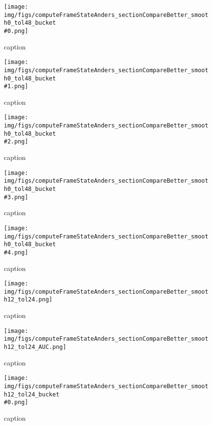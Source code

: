 %
\begin{figure}[!ht]
	\centering
	\texttt{[image: img/figs/computeFrameStateAnders\_sectionCompareBetter\_smooth0\_tol48\_bucket\\\#0.png]}
	\caption{caption}
	\label{fig:computeFrameStateAnders_sectionCompareBetter_smooth0_tol48_bucket\#0.png}
\end{figure}
%
\begin{figure}[!ht]
	\centering
	\texttt{[image: img/figs/computeFrameStateAnders\_sectionCompareBetter\_smooth0\_tol48\_bucket\\\#1.png]}
	\caption{caption}
	\label{fig:computeFrameStateAnders_sectionCompareBetter_smooth0_tol48_bucket\#1.png}
\end{figure}
%
\begin{figure}[!ht]
	\centering
	\texttt{[image: img/figs/computeFrameStateAnders\_sectionCompareBetter\_smooth0\_tol48\_bucket\\\#2.png]}
	\caption{caption}
	\label{fig:computeFrameStateAnders_sectionCompareBetter_smooth0_tol48_bucket\#2.png}
\end{figure}
%
\begin{figure}[!ht]
	\centering
	\texttt{[image: img/figs/computeFrameStateAnders\_sectionCompareBetter\_smooth0\_tol48\_bucket\\\#3.png]}
	\caption{caption}
	\label{fig:computeFrameStateAnders_sectionCompareBetter_smooth0_tol48_bucket\#3.png}
\end{figure}
%
\begin{figure}[!ht]
	\centering
	\texttt{[image: img/figs/computeFrameStateAnders\_sectionCompareBetter\_smooth0\_tol48\_bucket\\\#4.png]}
	\caption{caption}
	\label{fig:computeFrameStateAnders_sectionCompareBetter_smooth0_tol48_bucket\#4.png}
\end{figure}
%
\begin{figure}[!ht]
	\centering
	\texttt{[image: img/figs/computeFrameStateAnders\_sectionCompareBetter\_smooth12\_tol24.png]}
	\caption{caption}
	\label{fig:computeFrameStateAnders_sectionCompareBetter_smooth12_tol24.png}
\end{figure}
%
\begin{figure}[!ht]
	\centering
	\texttt{[image: img/figs/computeFrameStateAnders\_sectionCompareBetter\_smooth12\_tol24\_AUC.png]}
	\caption{caption}
	\label{fig:computeFrameStateAnders_sectionCompareBetter_smooth12_tol24_AUC.png}
\end{figure}
%
\begin{figure}[!ht]
	\centering
	\texttt{[image: img/figs/computeFrameStateAnders\_sectionCompareBetter\_smooth12\_tol24\_bucket\\\#0.png]}
	\caption{caption}
	\label{fig:computeFrameStateAnders_sectionCompareBetter_smooth12_tol24_bucket\#0.png}
\end{figure}
